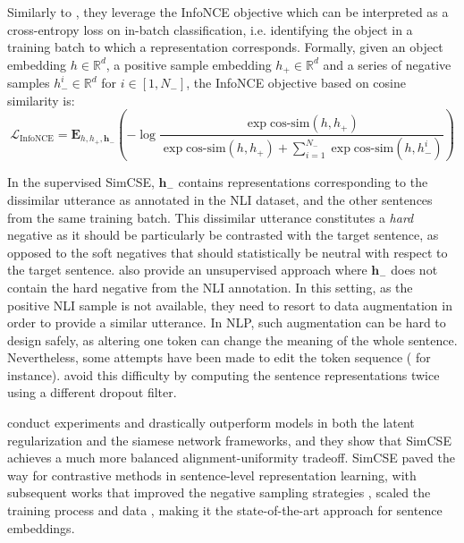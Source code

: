 Similarly to \citet{simclr}, they leverage the InfoNCE objective \citep{oord2019representationlearningcontrastivepredictive} which can be interpreted as a cross-entropy loss on in-batch classification, i.e. identifying the object in a training batch to which a representation corresponds. Formally, given an object embedding $h \in \mathbb{R}^d$, a positive sample embedding $h_+ \in \mathbb{R}^d$ and a series of negative samples $h^i_- \in \mathbb{R}^d$ for $i \in [1, N_-]$, the InfoNCE objective based on cosine similarity is:
$$
\mathcal{L}_{\text{InfoNCE}} = \mathbf{E}_{h, h_+, \mathbf{h}_-}\left(-\log \frac{\exp \text{cos-sim}(h, h_+)}{\exp \text{cos-sim}(h, h_+) + \sum_{i=1}^{N_-} \exp \text{cos-sim}(h, h^i_-)}\right)
$$

In the supervised SimCSE, $\mathbf{h}_-$ contains representations corresponding to the dissimilar utterance as annotated in the NLI dataset, and the other sentences from the same training batch. This dissimilar utterance constitutes a \textit{hard} negative as it should be particularly be contrasted with the target sentence, as opposed to the soft negatives that should statistically be neutral with respect to the target sentence. \citet{gao-etal-2021-simcse} also provide an unsupervised approach where $\mathbf{h}_-$ does not contain the hard negative from the NLI annotation. In this setting, as the positive NLI sample is not available, they need to resort to data augmentation in order to provide a similar utterance. In NLP, such augmentation can be hard to design safely, as altering one token can change the meaning of the whole sentence. Nevertheless, some attempts have been made to edit the token sequence (\citet{10.1145/3593590} for instance). \citet{gao-etal-2021-simcse} avoid this difficulty by computing the sentence representations twice using a different dropout filter.

\citet{gao-etal-2021-simcse} conduct experiments and drastically outperform models in both the latent regularization and the siamese network frameworks, and they show that SimCSE achieves a much more balanced alignment-uniformity tradeoff. SimCSE paved the way for contrastive methods in sentence-level representation learning, with subsequent works that improved the negative sampling strategies \citep{yan-etal-2021-consert}, scaled the training process and data \citep{li2023generaltextembeddingsmultistage}, making it the state-of-the-art approach for sentence embeddings.

\vspace{2em}

